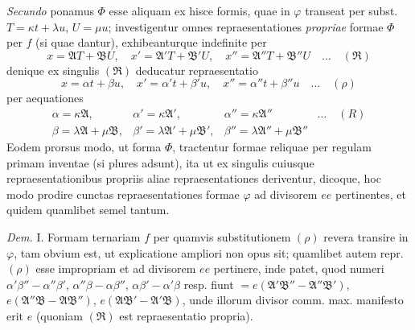 \textit{Secundo} ponamus $\Phi$ esse aliquam ex hisce formis, quae in $\varphi$ transeat per subst. $T=\kappa t+\lambda u$, $U=\mu u$; investigentur omnes repraesentationes \textit{propriae}
formae $\Phi$ per $f$ (si quae dantur), exhibeanturque indefinite per
\[
x=\mathfrak{A}T+\mathfrak{B}U,\quad x'=\mathfrak{A}'T+\mathfrak{B}'U,\quad x''=\mathfrak{A}''T+\mathfrak{B}''U\quad\ldots\quad(\mathfrak{R})
\]
denique ex singulis $(\mathfrak{R})$ deducatur repraesentatio
\[
x=\alpha t+\beta u,\quad x'=\alpha't+\beta'u,\quad x''=\alpha''t+\beta''u\quad\ldots\quad(\rho)
\]
per aequationes
\[
\begin{array}{llll}
\alpha=\kappa\mathfrak{A},&\alpha'=\kappa\mathfrak{A}',&\alpha''=\kappa\mathfrak{A}''&\ldots\quad(R)\\
\beta=\lambda\mathfrak{A}+\mu\mathfrak{B},&\beta'=\lambda\mathfrak{A}'+\mu\mathfrak{B}',&\beta''=\lambda\mathfrak{A}''+\mu\mathfrak{B}''&
\end{array}
\]
Eodem prorsus modo, ut forma $\Phi$, tractentur formae reliquae per regulam primam inventae (si plures adsunt), ita ut ex singulis cuiusque repraesentationibus propriis aliae repraesentationes deriventur, dicoque, hoc modo prodire cunctas repraesentationes formae $\varphi$ ad divisorem $ee$ pertinentes, et quidem quamlibet semel tantum.

\textit{Dem.} I. Formam ternariam $f$ per quamvis substitutionem $(\rho)$ revera transire in $\varphi$, tam obvium est, ut explicatione ampliori non opus sit; quamlibet autem repr. $(\rho)$ esse impropriam et ad divisorem $ee$ pertinere, inde patet, quod numeri $\alpha'\beta''-\alpha''\beta'$, $\alpha''\beta-\alpha\beta''$, $\alpha\beta'-\alpha'\beta$ resp. fiunt $=e(\mathfrak{A}'\mathfrak{B}''-\mathfrak{A}''\mathfrak{B}')$, $e(\mathfrak{A}''\mathfrak{B}-\mathfrak{A}\mathfrak{B}'')$, $e(\mathfrak{A}\mathfrak{B}'-\mathfrak{A}'\mathfrak{B})$, unde illorum divisor comm. max. manifesto erit $e$ (quoniam $(\mathfrak{R})$ est repraesentatio propria).

